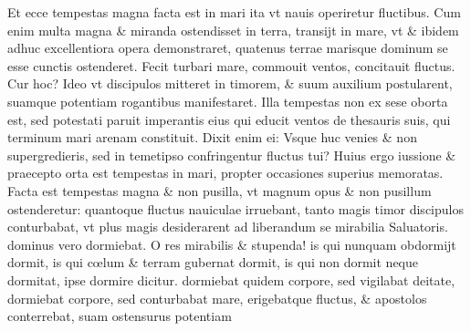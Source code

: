 \documentclass[a5paper,10pt]{book}
\def\oe{œ}
\begin{document}
\begin{multicols*}{2}
Et ecce tempestas magna facta est in mari ita vt nauis operiretur fluctibus. Cum enim multa magna \& miranda ostendisset in terra, transijt in mare, vt \& ibidem adhuc excellentiora opera demonstraret, quatenus terrae marisque dominum se esse cunctis ostenderet. Fecit turbari mare, commouit ventos, concitauit fluctus. Cur hoc? Ideo vt discipulos mitteret in timorem, \& suum auxilium postularent, suamque potentiam rogantibus manifestaret. Illa tempestas non ex sese oborta est, sed potestati paruit imperantis eius qui educit ventos de thesauris suis, qui terminum mari arenam constituit. Dixit enim ei: Vsque huc venies \& non supergredieris, sed in temetipso confringentur fluctus tui? Huius ergo iussione \& praecepto orta est tempestas in mari, propter occasiones superius memoratas. Facta est tempestas magna \& non pusilla, vt magnum opus \& non pusillum ostenderetur: quantoque fluctus nauiculae irruebant, tanto magis timor discipulos conturbabat, vt plus magis desiderarent ad liberandum se mirabilia Saluatoris. dominus vero dormiebat. O res mirabilis \& stupenda! is qui nunquam obdormijt dormit, is qui c\oe lum \& terram gubernat dormit, is qui non dormit neque dormitat, ipse dormire dicitur. dormiebat quidem corpore, sed vigilabat deitate, dormiebat corpore, sed conturbabat mare, erigebatque fluctus, \& apostolos conterrebat, suam ostensurus potentiam


\end{multicols*}
\end{document}
